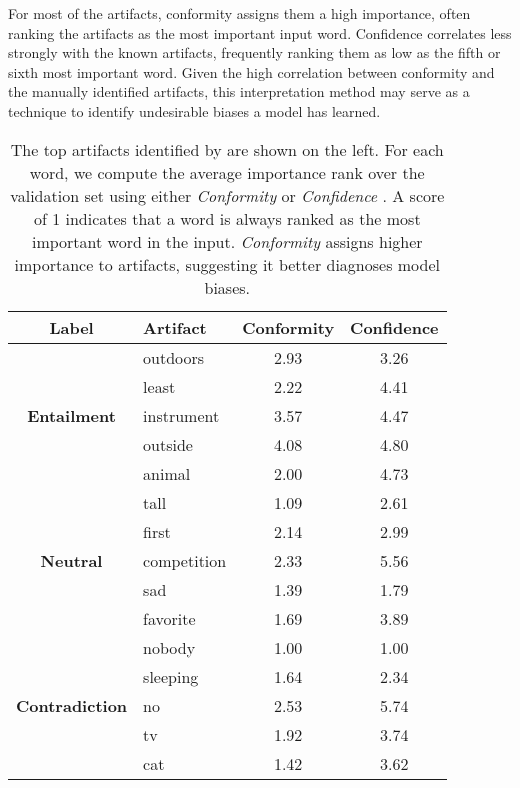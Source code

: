 For most of the artifacts, conformity \loo{} assigns them a high importance,
often ranking the artifacts as the most important input word. 
Confidence \loo{} correlates less strongly with the known artifacts, frequently ranking them
as low as the fifth or sixth most important word. Given the high correlation between 
conformity \loo{} and the manually identified artifacts, this interpretation method may serve as
a technique to identify undesirable biases a model has learned.



\begin{table}
\setlength{\tabcolsep}{2pt}
\centering
\small
\begin{tabular}{clcc}
\toprule
\textbf{Label} & \textbf{Artifact} & \textbf{Conformity} & \textbf{Confidence} \\
\midrule
\multirow{5}{*}{\textbf{Entailment}}
& outdoors & 2.93 & 3.26 \\
& least & 2.22 & 4.41 \\
& instrument & 3.57 & 4.47 \\
& outside & 4.08 & 4.80 \\
& animal & 2.00 & 4.73 \\
\midrule
\multirow{5}{*}{\textbf{Neutral}}
& tall & 1.09 & 2.61 \\
& first & 2.14 & 2.99 \\
& competition & 2.33 & 5.56 \\
& sad & 1.39 & 1.79 \\
& favorite & 1.69 & 3.89 \\
\midrule
\multirow{5}{*}{\textbf{Contradiction}}
& nobody & 1.00 & 1.00 \\
& sleeping & 1.64 & 2.34 \\
& no & 2.53 & 5.74 \\
& tv & 1.92 & 3.74 \\
& cat & 1.42 & 3.62 \\
\bottomrule
\end{tabular}
\caption{The top  artifacts identified by \citet{gururangan2018annotation} are shown on the left. For each word, we compute the average importance rank over the validation set using either \textit{Conformity} or \textit{Confidence} \loo{}. A score of 1 indicates that a word is always ranked as the most important word in the input. \textit{Conformity} \loo{} assigns higher importance to artifacts, suggesting it better diagnoses model biases.}
\label{table:words}
\end{table}
